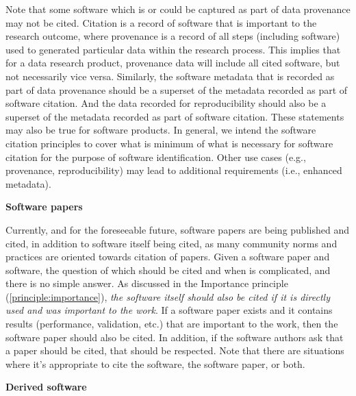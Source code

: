 \documentclass[11pt, oneside]{amsart}
\newcommand{\dmnote}[1]{ {\textcolor{purple} { ***DM: #1 }}} %
\newcommand{\ssnote}[1]{ {\textcolor{bondiblue} { ***SS: #1}}} %
\begin{document}
Note that some software which is or could be captured as part of data provenance may not be cited.
Citation is a record of software that is important to the research outcome, where provenance is a record of all steps (including software) used to generated particular data within the research process.
This implies that for a data research product, provenance data will include all cited software, but not necessarily vice versa.
Similarly, the software metadata that is recorded as part of data provenance should be a superset of the metadata recorded as part of software citation.
And the data recorded for reproducibility should also be a superset of the metadata recorded as part of software citation.
These statements may also be true for software products.
In general, we intend the software citation principles to cover what is minimum of what is necessary for software citation for the purpose of software identification.
Other use cases (e.g., provenance, reproducibility) may lead to additional requirements (i.e., enhanced metadata).

\textbf{Software papers}

Currently, and for the foreseeable future, software papers are being published and cited,
in addition to software itself being cited, as many community norms and practices are
oriented towards citation of papers.
Given a software paper and software, the question of which should be cited and when is
complicated, and there is no simple answer.
As discussed in the Importance principle (\ref{principle:importance}), \textit{the software
itself should also be cited if it is directly used and was important to the work}.
If a software paper exists and it contains results (performance, validation, etc.) that are
important to the work, then the software paper should also be cited.
In addition, if the software authors ask that a paper should be cited, that should be respected.
Note that there are situations where it's appropriate to cite the software, the software paper, or both.

\textbf{Derived software}
\end{document}
